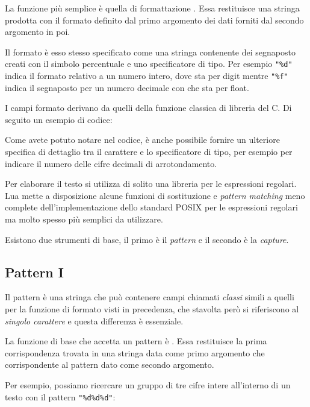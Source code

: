 La funzione più semplice è quella di formattazione
. Essa restituisce una stringa prodotta
con il formato definito dal primo argomento dei dati forniti dal secondo
argomento in poi.

Il formato è esso stesso specificato come una stringa contenente dei segnaposto
creati con il simbolo percentuale e uno specificatore di tipo. Per esempio
\verb|"%d"| indica il formato relativo a un numero intero, dove  sta per
digit mentre \verb|"%f"| indica il segnaposto per un numero decimale con 
che sta per float.

I campi formato derivano da quelli della funzione classica di libreria
 del C. Di seguito un esempio di codice:

Come avete potuto notare nel codice, è anche possibile fornire un ulteriore
specifica di dettaglio tra il carattere \key{\%} e lo specificatore di tipo, per
esempio per indicare il numero delle cifre decimali di arrotondamento.

Per elaborare il testo si utilizza di solito una libreria per le espressioni
regolari. Lua mette a disposizione alcune funzioni di sostituzione e
\emph{pattern matching} meno complete dell'implementazione dello standard
POSIX per le espressioni regolari ma molto spesso più semplici da utilizzare.

Esistono due strumenti di base, il primo è il \emph{pattern} e il secondo è la
\emph{capture}.


\subsection{Pattern I}
\label{secFondPattern}

Il pattern è una stringa che può contenere campi chiamati \emph{classi} simili
a quelli per la funzione di formato visti in precedenza, che stavolta però si
riferiscono al \emph{singolo carattere} e questa differenza è essenziale.

La funzione di base che accetta un pattern è
. Essa restituisce la prima corrispondenza
trovata in una stringa data come primo argomento che corrispondente al pattern
dato come secondo argomento.

Per esempio, possiamo ricercare un gruppo di tre cifre intere all'interno di un
testo con il pattern \verb|"%d%d%d"|:

